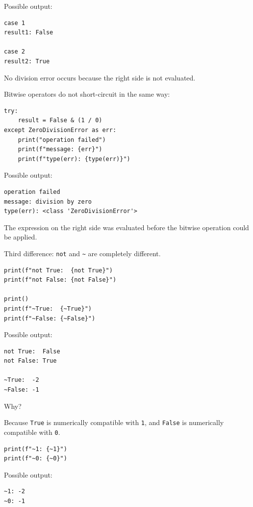 Possible output:

\begin{verbatim}
case 1
result1: False

case 2
result2: True
\end{verbatim}

No division error occurs because the right side is not evaluated.

Bitwise operators do not short-circuit in the same way:

\begin{verbatim}
try:
    result = False & (1 / 0)
except ZeroDivisionError as err:
    print("operation failed")
    print(f"message: {err}")
    print(f"type(err): {type(err)}")
\end{verbatim}

Possible output:

\begin{verbatim}
operation failed
message: division by zero
type(err): <class 'ZeroDivisionError'>
\end{verbatim}

The expression on the right side was evaluated before the bitwise operation could be applied.

Third difference: \texttt{not} and \texttt{\textasciitilde{}} are completely different.

\begin{verbatim}
print(f"not True:  {not True}")
print(f"not False: {not False}")

print()
print(f"~True:  {~True}")
print(f"~False: {~False}")
\end{verbatim}

Possible output:

\begin{verbatim}
not True:  False
not False: True

~True:  -2
~False: -1
\end{verbatim}

Why?

Because \texttt{True} is numerically compatible with \texttt{1}, and \texttt{False} is numerically compatible with \texttt{0}.

\begin{verbatim}
print(f"~1: {~1}")
print(f"~0: {~0}")
\end{verbatim}

Possible output:

\begin{verbatim}
~1: -2
~0: -1
\end{verbatim}

